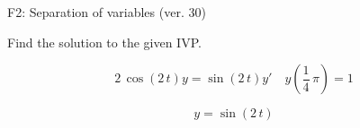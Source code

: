 \begin{exercise}
  \begin{exerciseTitle}F2: Separation of variables (ver. 30)\end{exerciseTitle}
  \begin{exerciseStatement}
    
Find the solution to the given IVP.

    
\[2 \, \cos\left(2 \, t\right) y= \sin\left(2 \, t\right) y'\hspace{1em} y\left( \frac{1}{4} \, \pi \right)= 1\]

  \end{exerciseStatement}
  \begin{exerciseAnswer}
    
\[y= \sin\left(2 \, t\right)\]

  \end{exerciseAnswer}
\end{exercise}
